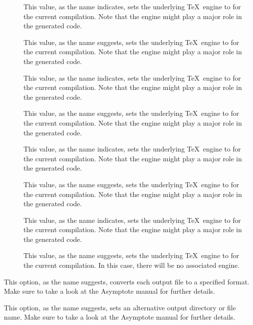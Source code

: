 \begin{description}
\begin{description}
\begin{description}
\item[] This value, as the name indicates, sets the underlying \TeX\ engine to  for the current compilation. Note that the engine might play a major role in the generated code.

\item[] This value, as the name suggests, sets the underlying \TeX\ engine to  for the current compilation. Note that the engine might play a major role in the generated code.

\item[] This value, as the name indicates, sets the underlying \TeX\ engine to  for the current compilation. Note that the engine might play a major role in the generated code.

\item[] This value, as the name suggests, sets the underlying \TeX\ engine to  for the current compilation. Note that the engine might play a major role in the generated code.

\item[] This value, as the name indicates, sets the underlying \TeX\ engine to  for the current compilation. Note that the engine might play a major role in the generated code.

\item[] This value, as the name suggests, sets the underlying \TeX\ engine to  for the current compilation. Note that the engine might play a major role in the generated code.

\item[] This value, as the name indicates, sets the underlying \TeX\ engine to  for the current compilation. Note that the engine might play a major role in the generated code.

\item[] This value, as the name suggests, sets the underlying \TeX\ engine to  for the current compilation. In this case, there will be no associated engine.
\end{description} 

\item[\abox{format}] This option, as the name suggests, converts each output file to a specified format. Make sure to take a look at the Asymptote manual for further details.

\item[\abox{output}] This option, as the name suggests, sets an alternative output directory or file name. Make sure to take a look at the Asymptote manual for further details.


\end{description}
\end{description}
